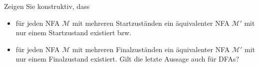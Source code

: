 
\begin{exercise}

Zeigen Sie konstruktiv, dass 
\begin{itemize}
 \item für jeden NFA $\mathcal{M}$ mit mehreren Startzuständen ein äquivalenter NFA $\mathcal{M'}$ mit nur einem Startzustand existiert bzw. 
 \item für jeden NFA $\mathcal{M}$ mit mehreren Finalzuständen ein äquivalenter NFA $\mathcal{M'}$ mit nur einem Finalzustand existiert. Gilt die letzte Aussage auch für DFAs?
\end{itemize}
\end{exercise}

	
